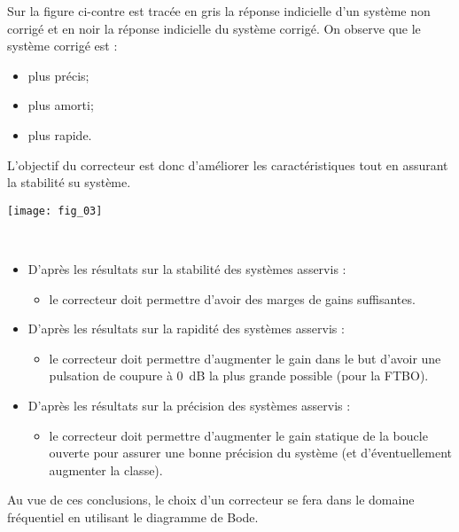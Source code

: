 \vspace{.25cm}

\noindent
\begin{minipage}[c]{.6\linewidth}
\hspace{.4cm} Sur la figure ci-contre est tracée en gris la réponse indicielle d'un système non corrigé et en noir la réponse indicielle du système corrigé. On observe que le système corrigé est :
\begin{itemize}
\item plus précis;
\item plus amorti;
\item plus rapide. 
\end{itemize}
L'objectif du correcteur est donc d'améliorer les caractéristiques tout en assurant la stabilité su système.
\end{minipage} \hfill
\begin{minipage}[c]{.35\linewidth}
\begin{center}
\texttt{[image: fig\_03]}
\end{center}
\end{minipage} 

\begin{resultat} ~\\

\begin{itemize}
\item D'après les résultats sur la stabilité des systèmes asservis :
\begin{itemize}
\item le correcteur doit permettre d'avoir des marges de gains suffisantes.
\end{itemize}
\item D'après les résultats sur la rapidité des systèmes asservis :
\begin{itemize}
\item le correcteur doit permettre d'augmenter le gain dans le but d'avoir une pulsation de coupure à \SI{0}{dB} la plus grande possible (pour la FTBO).
\end{itemize}
\item D'après les résultats sur la précision des systèmes asservis :
\begin{itemize}
\item le correcteur doit permettre d'augmenter le gain statique de la boucle ouverte pour assurer une bonne précision du système (et d’éventuellement augmenter la classe).
\end{itemize}
\end{itemize}

Au vue de ces conclusions, le choix d'un correcteur se fera dans le domaine fréquentiel en utilisant le diagramme de Bode. 
\end{resultat}

